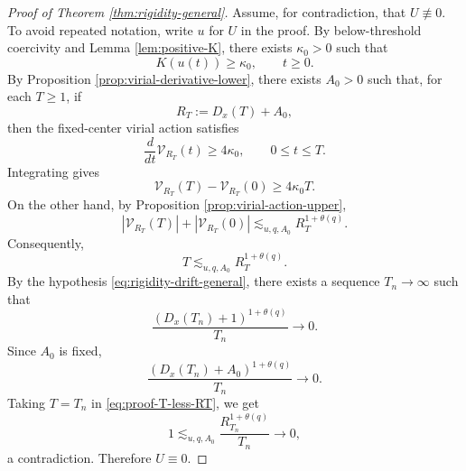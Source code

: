 \documentclass[smallextended,envcountsect,nospthms]{svjour3}
\numberwithin{equation}{section}
\theoremstyle{spbreak}
\theoremstyle{spdefbreak}
\theoremstyle{spdefbreak}
\newcommand{\Vc}{\mathcal V}
\begin{document}
\begin{proof}[Proof of Theorem \ref{thm:rigidity-general}]
Assume, for contradiction, that $U\not\equiv0$. To avoid repeated notation, write $u$ for $U$ in the proof. By below-threshold coercivity and Lemma \ref{lem:positive-K}, there exists $\kappa_0>0$ such that
\begin{equation*}
  K(u(t))\ge\kappa_0,
  \qquad t\ge0.
\end{equation*}
By Proposition \ref{prop:virial-derivative-lower}, there exists $A_0>0$ such that, for each $T\ge1$, if
\begin{equation*}
  R_T:=D_x(T)+A_0,
\end{equation*}
then the fixed-center virial action satisfies
\begin{equation*}
  \frac{d}{dt}\Vc_{R_T}(t)\ge4\kappa_0,
  \qquad 0\le t\le T.
\end{equation*}
Integrating gives
\begin{equation*}
  \Vc_{R_T}(T)-\Vc_{R_T}(0)\ge4\kappa_0T.
\end{equation*}
On the other hand, by Proposition \ref{prop:virial-action-upper},
\begin{equation*}
  |\Vc_{R_T}(T)|+|\Vc_{R_T}(0)|
  \lesssim_{u,q,A_0} R_T^{1+\theta(q)}.
\end{equation*}
Consequently,
\begin{equation}\label{eq:proof-T-less-RT}
  T\lesssim_{u,q,A_0} R_T^{1+\theta(q)}.
\end{equation}
By the hypothesis \eqref{eq:rigidity-drift-general}, there exists a sequence $T_n\to\infty$ such that
\begin{equation*}
  \frac{(D_x(T_n)+1)^{1+\theta(q)}}{T_n}\to0.
\end{equation*}
Since $A_0$ is fixed,
\begin{equation*}
  \frac{(D_x(T_n)+A_0)^{1+\theta(q)}}{T_n}\to0.
\end{equation*}
Taking $T=T_n$ in \eqref{eq:proof-T-less-RT}, we get
\begin{equation*}
  1\lesssim_{u,q,A_0}
  \frac{R_{T_n}^{1+\theta(q)}}{T_n}\to0,
\end{equation*}
a contradiction. Therefore $U\equiv0$.
\end{proof}
\end{document}
